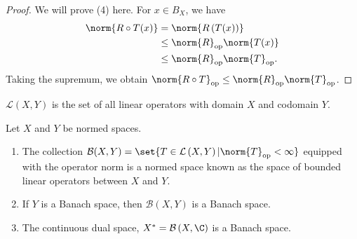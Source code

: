 \documentclass[10pt]{mypackage}
\begin{document}
\begin{proof}
  We will prove (4) here. For $x\in B_{X}$, we have
  \begin{align*}
    \norm{R\circ T(x)} &= \norm{R\left(T(x)\right)}\\
                       &\leq \norm{R}_{\text{op}}\norm{T(x)}\\
                       &\leq \norm{R}_{\text{op}}\norm{T}_{\text{op}}.
  \end{align*}
  Taking the supremum, we obtain $\norm{R\circ T}_{\text{op}}\leq \norm{R}_{\text{op}}\norm{T}_{\text{op}}$.
\end{proof}
\begin{recall}
  $\mathcal{L}(X,Y)$ is the set of all linear operators with domain $X$ and codomain $Y$.
\end{recall}
\begin{proposition}
  Let $X$ and $Y$ be normed spaces.
  \begin{enumerate}[(1)]
    \item The collection $\mathcal{B}(X,Y) = \set{T\in \mathcal{L}\left(X,Y\right)| \norm{T}_{\text{op}} < \infty}$ equipped with the operator norm is a normed space known as the space of bounded linear operators between $X$ and $Y$.
    \item If $Y$ is a Banach space, then $\mathcal{B}\left(X,Y\right)$ is a Banach space.
    \item The continuous dual space, $X^{\ast} = \mathcal{B}\left(X,\C\right)$ is a Banach space.
  \end{enumerate}
\end{proposition}
\end{document}
